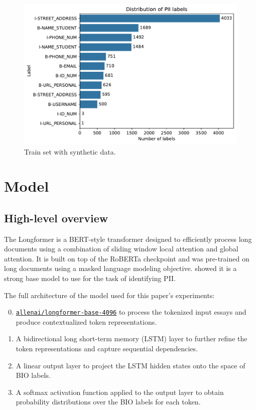 \documentclass[11pt]{article}
\begin{document}
\begin{figure}[h!]
  \centering
  \includegraphics[width=\columnwidth]{images/label_distribution_synth.pdf}
  \caption{Train set with synthetic data.}
  \label{fig:label_distribution_synth}
\end{figure}

\section{Model}

\subsection{High-level overview}
The Longformer \cite{abs-2004-05150} is a BERT-style transformer designed to efficiently process long documents using a combination of sliding window local attention and global attention. It is built on top of the RoBERTa checkpoint and was pre-trained on long documents using a masked language modeling objective. \citealt{pilan-etal-2022-text} showed it is a strong base model to use for the task of identifying PII.

The full architecture of the model used for this paper's experiments:

\begin{enumerate}
  \setcounter{enumi}{-1}
  \item \href{https://huggingface.co/allenai/longformer-base-4096}{\texttt{allenai/longformer-base-4096}} to process the tokenized input essays and produce contextualized token representations.
  \item A bidirectional long short-term memory (LSTM) layer to further refine the token representations and capture sequential dependencies.
  \item A linear output layer to project the LSTM hidden states onto the space of BIO labels.
  \item A softmax activation function applied to the output layer to obtain probability distributions over the BIO labels for each token.
\end{enumerate}
\end{document}
